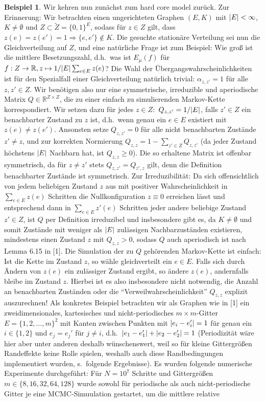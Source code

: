 \documentclass[twoside]{article}
\theoremstyle{definition}
\newtheorem{example}[theorem]{Beispiel}
\begin{document}
\begin{example}
Wir kehren nun zunächst zum hard core model zurück. Zur Erinnerung: Wir betrachten einen ungerichteten Graphen $(E,K)$ mit $\abs{E} < \infty$, $K \neq \emptyset$ und $Z \subset \tilde{Z}=\{0,1\}^E$, sodass für $z \in Z$ gilt, dass $z(e)=z(e')=1 \Rightarrow \{e,e'\} \notin K$. Die gesuchte stationäre Verteilung sei nun die Gleichverteilung auf $Z$, und eine natürliche Frage ist zum Beispiel: Wie groß ist die mittlere Besetzungszahl, d.h.\ was ist $E_\mu(f)$ für $f:Z \to \mathbb{R}, z \mapsto 1/\abs{E} \sum_ {e \in E} z(e)$? Die Wahl der Übergangswahrscheinlichkeiten ist für den Spezialfall einer Gleichverteilung natürlich trivial: $\alpha_{z,z'}=1$ für alle $z,z' \in Z$. Wir benötigen also nur eine symmetrische, irreduzible und aperiodische Matrix $Q \in \mathbb{R}^{Z \times Z}$, die zu einer einfach zu simulierenden Markov-Kette korrespondiert. Wir setzen dazu für jedes $z \in Z:$ $Q_{z,z'} = 1/\abs{E}$, falls $z' \in Z$ ein benachbarter Zustand zu $z$ ist, d.h.\ wenn genau ein $e \in E$ existiert mit $z(e) \neq z(e')$. Ansonsten setze $Q_{z,z'}=0$ für alle nicht benachbarten Zustände $z' \neq z$, und zur korrekten Normierung $Q_{z,z} = 1 - \sum_{z' \in Z} Q_{z,z'}$ (da jeder Zustand höchstens $\abs{E}$ Nachbarn hat, ist $Q_{z,z} \geq 0$).  Die so erhaltene Matrix ist offenbar symmetrisch, da für $z \neq z'$ stets $Q_{z,z'}=Q_{z',z}$ gilt, denn die Definition benachbarter Zustände ist symmetrisch. Zur Irreduzibilität: Da sich offensichtlich von jedem beliebigen Zustand $z$ aus mit positiver Wahrscheinlichkeit in $\sum_{e \in E} z(e)$ Schritten die Nullkonfiguration $z  \equiv 0$ erreichen lässt und entsprechend dann in $\sum_{e \in E} z'(e)$ Schritten jeder andere beliebige Zustand $z' \in Z$, ist $Q$ per Definition irreduzibel und insbesondere gibt es, da $K \neq \emptyset$ und somit Zustände mit weniger als $\abs{E}$ zulässigen Nachbarzuständen existieren, mindestens einen Zustand $z$ mit $Q_{z,z} > 0$, sodass $Q$ auch aperiodisch ist nach Lemma 6.15 in [1]. Die Simulation der zu $Q$ gehörenden Markov-Kette ist einfach: Ist die Kette im Zustand $z$, so wähle gleichverteilt ein $e \in E$. Falls sich durch Ändern von $z(e)$ ein zulässiger Zustand ergibt, so ändere $z(e)$, andernfalls bleibe im Zustand $z$. Hierbei ist es also insbesondere nicht notwendig, die Anzahl an benachbarten Zuständen oder die \enquote{Verweilwahrscheinlichkeit} $Q_{z,z}$ explizit auszurechnen! Als konkretes Beispiel betrachten wir als Graphen wie in [1] ein zweidimensionales, kartesisches und nicht-periodisches $m \times m$-Gitter $E = \{1,2,\dots,m\}^2$ mit Kanten zwischen Punkten mit $\abs{e_i - e_i'} = 1$ für genau ein $i \in \{1,2\}$ und $e_j = e_j'$ für $j \neq i$, d.h.\ $\abs{e_1-e_1'} + \abs{e_2 - e_2'} = 1$ (Periodizität wäre hier aber unter anderen deshalb wünschenswert, weil so für kleine Gittergrößen Randeffekte keine Rolle spielen, weshalb auch diese Randbedingungen implementiert wurden, s.\ folgende Ergebnisse). Es wurden folgende numerische Experimente durchgeführt: Für $N=10^7$ Schritte und Gittergrößen $m \in \{8,16,32,64,128\}$ wurde sowohl für periodische als auch nicht-periodische Gitter je eine MCMC-Simuulation gestartet, um die mittlere relative 
\end{example}
\end{document}
